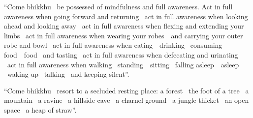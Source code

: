 \begin{english-only-justify}
  ``Come bhikkhu \breathmark\ be possessed of mindfulness and full awareness. Act in full awareness when going forward and returning \breathmark\ act in full awareness when looking ahead and looking away \breathmark\ act in full awareness when flexing and extending your limbs \breathmark\ act in full awareness when wearing your \mbox{robes}~\breathmark\ and carrying your outer robe and bowl \breathmark\ act in full awareness when \mbox{eating}~\breathmark\ drinking \breathmark\ consuming \ifbfiveversion \mbox{food}~\breathmark\ \else food \breathmark\ \fi and tasting \breathmark\ act in full awareness when defecating and urinating \breathmark\ act in full awareness when walking \breathmark\ \mbox{standing}~\breathmark\ sitting \breathmark\ falling \ifbfiveversion \mbox{asleep}~\breathmark\ \else asleep \breathmark\ \fi waking up\makeatletter\hyperlink{endnote60-appendix}\makeatother
  \breathmark\ talking \breathmark\ and keeping silent''.
\end{english-only-justify}

\begin{english-only-justify}
  ``Come bhikkhu \breathmark\ resort to a secluded resting place: a forest \breathmark\ the foot of a tree \breathmark\ a mountain \breathmark\ a ravine \breathmark\ a hillside cave \breathmark\ a charnel ground \breathmark\ a jungle thicket \breathmark\ an open space \breathmark\ a heap of straw''.
\end{english-only-justify}

\ifbfiveversion\clearpage\fi

